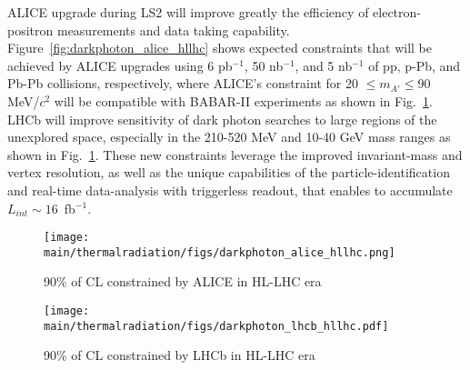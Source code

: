 \documentclass[../report.tex]{subfiles}
\providecommand{\main}{..}
\begin{document}
ALICE upgrade during LS2 will improve greatly 
the efficiency of electron-positron measurements and data taking capability.
Figure~\ref{fig:darkphoton_alice_hllhc} shows 
expected constraints that will be achieved by ALICE upgrades 
using 6 pb$^{-1}$, 50 nb$^{-1}$, and 
5 nb$^{-1}$ of pp, p-Pb, and Pb-Pb collisions, respectively, where 
ALICE's constraint for 20 $\le m_{A'} \le $90 MeV/$c^2$ 
will be compatible with BABAR-II experiments as shown in Fig.~\ref{fig:darkphoton_lhcb_hllhc}.
LHCb will improve sensitivity of dark photon searches to large regions 
of the unexplored space, especially in the 210-520 MeV and 10-40 GeV mass ranges
as shown in Fig.~\ref{fig:darkphoton_lhcb_hllhc}. 
These new constraints leverage the improved invariant-mass and vertex resolution, 
as well as the unique capabilities of the particle-identification and real-time 
data-analysis with triggerless readout, that enables to accumulate $L_{int} \sim 16$~fb$^{-1}$.

\begin{figure}[htbp]
 \begin{minipage}{0.5\hsize}
  \begin{center}
   \texttt{[image: \\main/thermalradiation/figs/darkphoton\_alice\_hllhc.png]}
  \end{center}
  \caption{90\% of CL constrained by ALICE in HL-LHC era}
  \label{fig:darkphoton_alice_hllhc}
 \end{minipage}
 \begin{minipage}{0.5\hsize}
  \begin{center}
   \texttt{[image: \\main/thermalradiation/figs/darkphoton\_lhcb\_hllhc.pdf]}
  \end{center}
  \caption{90\% of CL constrained by LHCb in HL-LHC era}
  \label{fig:darkphoton_lhcb_hllhc}
 \end{minipage}
\end{figure}


\end{document}
